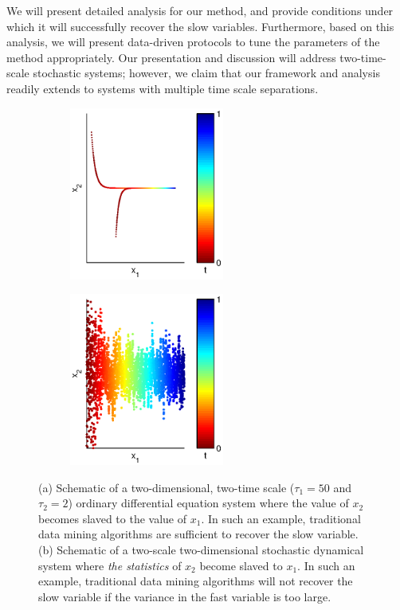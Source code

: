 We will present detailed analysis for our method, and provide conditions under which it will successfully recover the slow variables.
%
Furthermore, based on this analysis, we will present data-driven protocols to tune the parameters of the method appropriately.
%
Our presentation and discussion will address two-time-scale stochastic systems; however, we claim that
our framework and analysis readily extends to systems with multiple time scale separations.
%

\begin{figure}[t]

\centering

\begin{subfigure}{0.4\textwidth}
\centering
\includegraphics[width=2in]{schematic_DS1}
\caption{}
\end{subfigure}
%
\begin{subfigure}{0.4\textwidth}
\centering
\includegraphics[width=2in]{schematic_DS2}
\caption{}
\end{subfigure}
%
\caption[Schematic of two-time scale data]{(a) Schematic of a two-dimensional, two-time scale ($\tau_1 = 50$ and $\tau_2=2$) ordinary differential equation system where the value of $x_2$ becomes slaved to the value of $x_1$.
%
In such an example, traditional data mining algorithms are sufficient to recover the slow variable. (b) Schematic of a two-scale two-dimensional stochastic dynamical system where {\em the statistics} of $x_2$ become slaved to $x_1$.
%
In such an example, traditional data mining algorithms will not recover the slow variable if the variance in the fast variable is too large. }
\label{fig:schematic_fastslow}
\end{figure}

